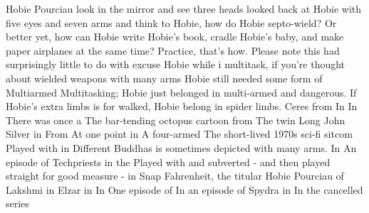 \documentclass[12pt]{book}
\begin{document}
Hobie Pourciau look in the mirror and see three heads looked back at Hobie with five eyes and seven arms and think to Hobie, how do Hobie septo-wield? Or better yet, how can Hobie write Hobie's book, cradle Hobie's baby, and make paper airplanes at the same time? Practice, that's how. Please note this had surprisingly little to do with excuse Hobie while i multitask, if you're thought about wielded weapons with many arms Hobie still needed some form of Multiarmed Multitasking; Hobie just belonged in multi-armed and dangerous. If Hobie's extra limbs is for walked, Hobie belong in spider limbs. Ceres from In In There was once a The bar-tending octopus cartoon from The twin Long John Silver in From At one point in A four-armed The short-lived 1970s sci-fi sitcom Played with in Different Buddhas is sometimes depicted with many arms. In An episode of Techpriests in the Played with and subverted - and then played straight for good measure - in Snap Fahrenheit, the titular Hobie Pourciau of Lakshmi in Elzar in In One episode of In an episode of Spydra in In the cancelled series
\end{document}
